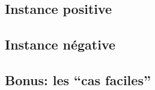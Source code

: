   \subsection{Instance positive}

  \subsection{Instance négative}

  \subsection{Bonus: les ``cas faciles''}